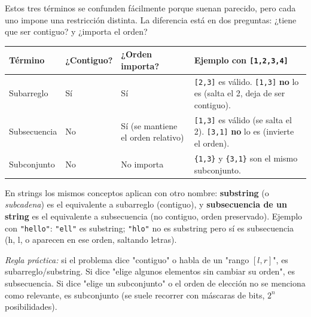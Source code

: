 Estos tres términos se confunden fácilmente porque suenan parecido, pero cada uno impone una restricción distinta. La diferencia está en dos preguntas: ¿tiene que ser contiguo? y ¿importa el orden?

\begin{center}
\small
\begin{tabular}{|p{1.7cm}|p{1.5cm}|p{2.2cm}|p{4cm}|}
\hline
\textbf{Término} & \textbf{¿Contiguo?} & \textbf{¿Orden importa?} & \textbf{Ejemplo con \texttt{[1,2,3,4]}} \\
\hline
Subarreglo & Sí & Sí & \texttt{[2,3]} es válido. \texttt{[1,3]} \textbf{no} lo es (salta el 2, deja de ser contiguo). \\
\hline
Subsecuencia & No & Sí (se mantiene el orden relativo) & \texttt{[1,3]} es válido (se salta el 2). \texttt{[3,1]} \textbf{no} lo es (invierte el orden). \\
\hline
Subconjunto & No & No importa & \texttt{\{1,3\}} y \texttt{\{3,1\}} son el mismo subconjunto. \\
\hline
\end{tabular}
\end{center}

En strings los mismos conceptos aplican con otro nombre: \textbf{substring} (o \textit{subcadena}) es el equivalente a subarreglo (contiguo), y \textbf{subsecuencia de un string} es el equivalente a subsecuencia (no contiguo, orden preservado). Ejemplo con \texttt{"hello"}: \texttt{"ell"} es substring; \texttt{"hlo"} no es substring pero sí es subsecuencia (h, l, o aparecen en ese orden, saltando letras).

\textit{Regla práctica:} si el problema dice "contiguo" o habla de un "rango \([l,r]\)", es subarreglo/substring. Si dice "elige algunos elementos sin cambiar su orden", es subsecuencia. Si dice "elige un subconjunto" o el orden de elección no se menciona como relevante, es subconjunto (se suele recorrer con máscaras de bits, \(2^n\) posibilidades).
